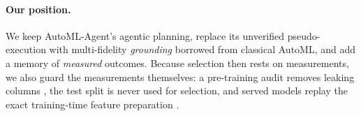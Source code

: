 \paragraph{Our position.} We keep AutoML-Agent's agentic planning, replace its unverified pseudo-execution with multi-fidelity \emph{grounding} borrowed from classical AutoML, and add a memory of \emph{measured} outcomes. Because selection then rests on measurements, we also guard the measurements themselves: a pre-training audit removes leaking columns \citep{kaufman2012leakage}, the test split is never used for selection, and served models replay the exact training-time feature preparation \citep{sculley2015debt}.
